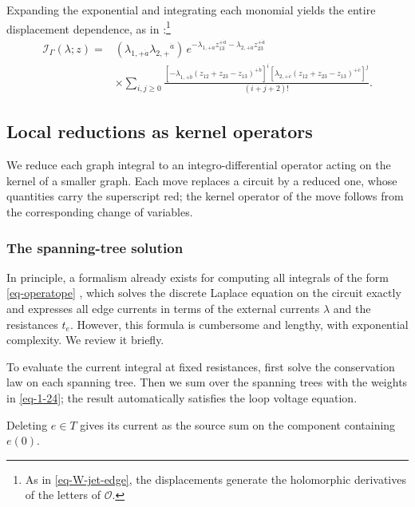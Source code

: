\documentclass[11pt]{article}
\numberwithin{equation}{section}
\numberwithin{figure}{section}
\numberwithin{table}{section}
\begin{document}
Expanding the exponential and integrating each monomial yields the entire displacement dependence, as in \cite[Equation (2.47)]{BK}:\footnote{As in \eqref{eq-W-jet-edge}, the displacements generate the holomorphic derivatives of the letters of $\mathcal O$.}
\begin{equation}\label{eq-1-46}
\begin{aligned}
\mathcal I_\Gamma(\lambda;z)
={}&(\lambda_{1,+\dot a}\lambda_{2,+}{}^{\dot a})\,
 e^{-\lambda_{1,+\dot a}z_{13}^{+\dot a}-\lambda_{2,+\dot a}z_{23}^{+\dot a}}\\
&\times\sum_{i,j\ge0}
\frac{[-\lambda_{1,+\dot b}(z_{12}+z_{23}-z_{13})^{+\dot b}]^i
[\lambda_{2,+\dot c}(z_{12}+z_{23}-z_{13})^{+\dot c}]^j}{(i+j+2)!}.
\end{aligned}
\end{equation}

\subsection{Local reductions as kernel operators}\label{sec-B-local-reduction}\label{sec-network}

We reduce each graph integral to an integro-differential operator acting on the kernel of a smaller graph. Each move replaces a circuit by a reduced one, whose quantities carry the superscript $\mathrm{red}$; the kernel operator of the move follows from the corresponding change of variables.

\subsubsection{The spanning-tree solution}\label{sec-B-spanning}

In principle, a formalism already exists for computing all integrals of the form \eqref{eq-operatope} \cite[Theorem 4 and Corollary 2]{Wang}, which solves the discrete Laplace equation on the circuit exactly and expresses all edge currents in terms of the external currents $\lambda$ and the resistances $t_e$. However, this formula is cumbersome and lengthy, with exponential complexity. We review it briefly.

To evaluate the current integral at fixed resistances, first solve the conservation law on each spanning tree. Then we sum over the spanning trees with the weights in \eqref{eq-1-24}; the result automatically satisfies the loop voltage equation.

Deleting $e\in T$ gives its current as the source sum on the component containing $e(0)$.
\end{document}
